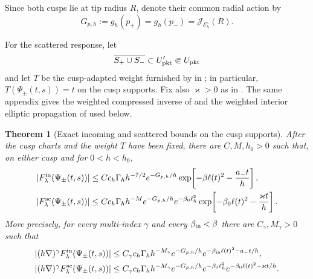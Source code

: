 \documentclass[11pt]{article}
\newtheorem{theorem}{Theorem}[section]
\newcommand{\cE}{\mathcal E}
\newcommand{\cJ}{\mathcal J}
\begin{document}
Since both cusps lie at tip radius $R$, denote their common radial action by
\begin{equation}
    G_{p, h} := g_h(p_+) = g_h(p_-) = \cJ_{\cE^\circ_h}(R).
\end{equation}

For the scattered response, let
\[
 \overline{S_+\cup S_-}\subset U'_{\rm pkt}\Subset U_{\rm pkt}
\]
and let $T$ be the cusp-adapted weight furnished by  in ; in particular, $T(\Psi_\pm(t,s))=t$ on the cusp supports. Fix also $\varkappa>0$ as in . The same appendix gives the weighted compressed inverse of  and the weighted interior elliptic propagation of  used below.

\begin{theorem}[Exact incoming and scattered bounds on the cusp supports]
\label{thm:source-new}
After the cusp charts and the weight $T$ have been fixed, there are
$C,M,h_0>0$ such that, on either cusp and for $0<h<h_0$,
\begin{align}
 |F_\lambda^{\rm in}(\Psi_\pm(t,s))|
 &\le Cc_h\Gamma_hh^{-7/2}e^{-G_{p,h}/h}
 \exp\!\left[-\beta\ell(t)^2-\frac{a_-t}{h}\right],
 \label{eq:source-in-bound}\\
 |F_\lambda^{\rm sc}(\Psi_\pm(t,s))|
 &\le Cc_h\Gamma_hh^{-M}e^{-G_{p,h}/h}
 e^{-\beta_0\ell_h^2}
 \exp\!\left[-\beta_0\ell(t)^2-\frac{\varkappa t}{h}\right].
 \label{eq:source-sc-bound}
\end{align}
More precisely, for every multi-index $\gamma$ and every
$\beta_{\rm in}<\beta$ there are $C_\gamma,M_\gamma>0$ such that
\begin{align}
 |(h\nabla)^\gamma F_\lambda^{\rm in}(\Psi_\pm(t,s))|
 &\le C_\gamma c_h\Gamma_hh^{-M_\gamma}e^{-G_{p,h}/h}
 e^{-\beta_{\rm in}\ell(t)^2-a_-t/h},
 \label{eq:source-in-derivative-bound}\\
 |(h\nabla)^\gamma F_\lambda^{\rm sc}(\Psi_\pm(t,s))|
 &\le C_\gamma c_h\Gamma_hh^{-M_\gamma}e^{-G_{p,h}/h}
 e^{-\beta_0\ell_h^2}
 e^{-\beta_0\ell(t)^2-\varkappa t/h}.
 \label{eq:source-sc-derivative-bound}
\end{align}
\end{theorem}
\end{document}
